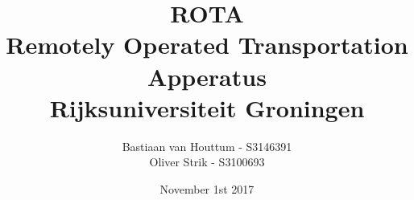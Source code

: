 \documentclass[11pt, a4paper]{article}
\begin{document}
\begin{titlepage}
  \centering
  \title{ROTA \\\large Remotely Operated Transportation Apperatus \\\small \textbf{Rijksuniversiteit Groningen}}
  \author{Bastiaan van Houttum - S3146391 \\ Oliver Strik - S3100693}
  \date{November 1st 2017}
  \maketitle
\end{titlepage}

\begin{abstract}
\noindent\blindtext
\end{abstract}
\pagebreak\tableofcontents
\pagebreak
\pagebreak
\pagebreak
\pagebreak
\pagebreak
\pagebreak

\end{document}
